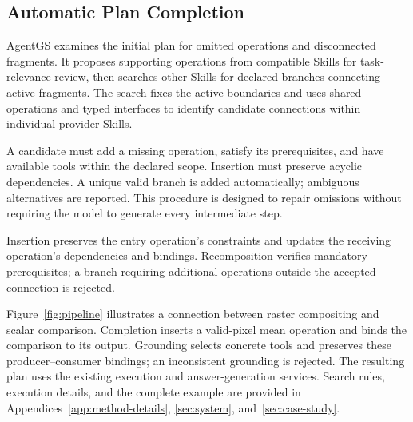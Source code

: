 \subsection{Automatic Plan Completion}
\label{sec:completion}
AgentGS examines the initial plan for omitted operations and disconnected fragments. It proposes supporting operations from compatible Skills for task-relevance review, then searches other Skills for declared branches connecting active fragments. The search fixes the active boundaries and uses shared operations and typed interfaces to identify candidate connections within individual provider Skills.

A candidate must add a missing operation, satisfy its prerequisites, and have available tools within the declared scope. Insertion must preserve acyclic dependencies. A unique valid branch is added automatically; ambiguous alternatives are reported. This procedure is designed to repair omissions without requiring the model to generate every intermediate step.

Insertion preserves the entry operation's constraints and updates the receiving operation's dependencies and bindings. Recomposition verifies mandatory prerequisites; a branch requiring additional operations outside the accepted connection is rejected.

Figure~\ref{fig:pipeline} illustrates a connection between raster compositing and scalar comparison. Completion inserts a valid-pixel mean operation and binds the comparison to its output. Grounding selects concrete tools and preserves these producer--consumer bindings; an inconsistent grounding is rejected. The resulting plan uses the existing execution and answer-generation services. Search rules, execution details, and the complete example are provided in Appendices~\ref{app:method-details}, \ref{sec:system}, and~\ref{sec:case-study}.
